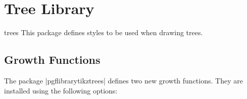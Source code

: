 %
%
%


\section{Tree Library}

\label{section-tree-library}


\begin{tikzlibrary}{trees}
  This package defines styles to be used when drawing trees. 
\end{tikzlibrary}

\subsection{Growth Functions}

The package |pgflibrarytikztrees| defines two new growth
functions. They are installed using the following options:

